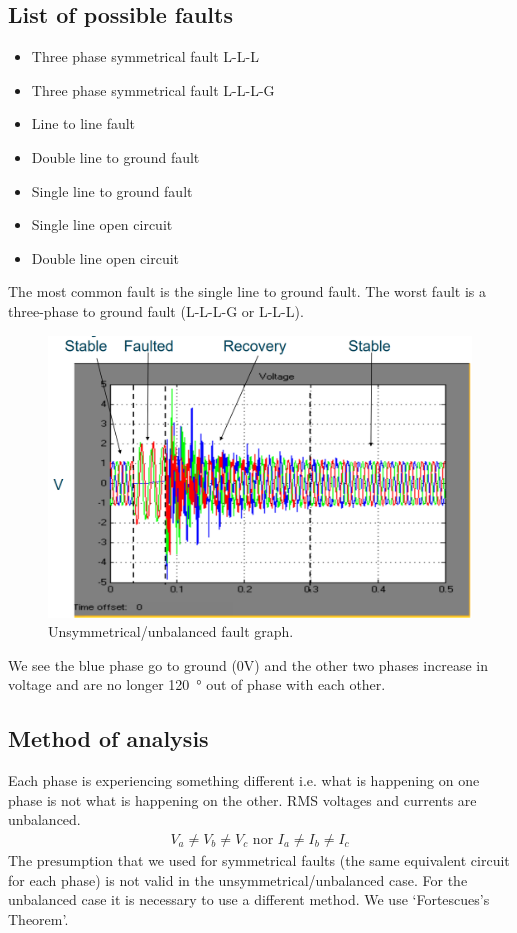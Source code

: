 \documentclass[class=report, crop=false, 12pt,a4paper]{standalone}
\begin{document}
\subsection{List of possible faults}
\begin{itemize}
	\item Three phase symmetrical fault L-L-L
	\item Three phase symmetrical fault L-L-L-G
	\item Line to line fault
	\item Double line to ground fault
	\item Single line to ground fault
	\item Single line open circuit
	\item Double line open circuit
\end{itemize}
The most common fault is the single line to ground fault. The worst fault is a three-phase to ground fault (L-L-L-G or L-L-L).
\begin{figure}[H]
	\centering
	\includegraphics[width = \textwidth]{../img/figure21.png}
	\caption{Unsymmetrical/unbalanced fault graph.}
\end{figure}
We see the blue phase go to ground (0V) and the other two phases increase in voltage and are no longer \SI{120}{\degree} out of phase with each other. 
\subsection{Method of analysis}
Each phase is experiencing something different i.e. what is happening on one phase is not what is happening on the other. RMS voltages and currents are unbalanced.
\begin{gather}
	V_a \neq V_b \neq V_c \textrm{ nor } I_a \neq I_b \neq I_c
\end{gather}
The presumption that we used for symmetrical faults (the same equivalent circuit for each phase) is not valid in the unsymmetrical/unbalanced case. For the unbalanced case it is necessary to use a different method. We use `Fortescues's Theorem'.
\end{document}
